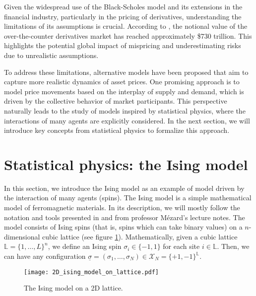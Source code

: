 Given the widespread use of the Black-Scholes model and its extensions in the financial industry, particularly in the pricing of derivatives, understanding the limitations of its assumptions is crucial. According to \cite{bis}, the notional value of the over-the-counter derivatives market has reached approximately \$730 trillion. This highlights the potential global impact of mispricing and underestimating risks due to unrealistic assumptions.

To address these limitations, alternative models have been proposed that aim to capture more realistic dynamics of asset prices. One promising approach is to model price movements based on the interplay of supply and demand, which is driven by the collective behavior of market participants. This perspective naturally leads to the study of models inspired by statistical physics, where the interactions of many agents are explicitly considered. In the next section, we will introduce key concepts from statistical physics to formalize this approach.
\newpage

\section{Statistical physics: the Ising model}
In this section, we introduce the Ising model as an example of model driven by the interaction of many agents (spins). The Ising model is a simple mathematical model of ferromagnetic materials. In its description, we will mostly follow the notation and tools presented in \cite{mezard_book} and from professor Mézard's lecture notes. The model consists of Ising spins (that is, spins which can take binary values) on a $n$-dimensional cubic lattice (see figure \ref{fig:ising_model}). Mathematically, given a cubic lattice $\mathbb{L}=\{1,\dots,L\}^n$, we define an Ising spin $\sigma_i\in\{-1,1\}$ for each site $i\in\mathbb{L}$. Then, we can have any configuration $\underline{\sigma} = (\sigma_1,\dots,\sigma_N) \in \mathcal{X}_N=\{+1,-1\}^{\mathbb{L}}$.

\begin{figure}[h]
    \centering
    \texttt{[image: 2D\_ising\_model\_on\_lattice.pdf]}
    \caption{The Ising model on a 2D lattice.}
    \label{fig:ising_model}
\end{figure}


